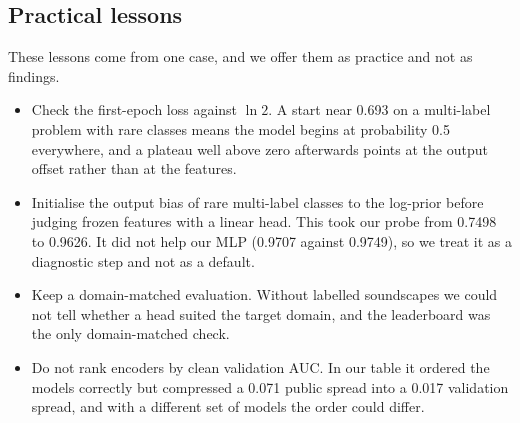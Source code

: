 \documentclass[letterpaper]{article} %
\begin{document}
\subsection{Practical lessons}
These lessons come from one case, and we offer them as practice and not as findings.
\begin{itemize}
\item Check the first-epoch loss against $\ln 2$. A start near 0.693 on a multi-label problem with rare classes means the model begins at probability 0.5 everywhere, and a plateau well above zero afterwards points at the output offset rather than at the features.
\item Initialise the output bias of rare multi-label classes to the log-prior before judging frozen features with a linear head. This took our probe from 0.7498 to 0.9626. It did not help our MLP (0.9707 against 0.9749), so we treat it as a diagnostic step and not as a default.
\item Keep a domain-matched evaluation. Without labelled soundscapes we could not tell whether a head suited the target domain, and the leaderboard was the only domain-matched check.
\item Do not rank encoders by clean validation AUC. In our table it ordered the models correctly but compressed a 0.071 public spread into a 0.017 validation spread, and with a different set of models the order could differ.
\end{itemize}
\end{document}
